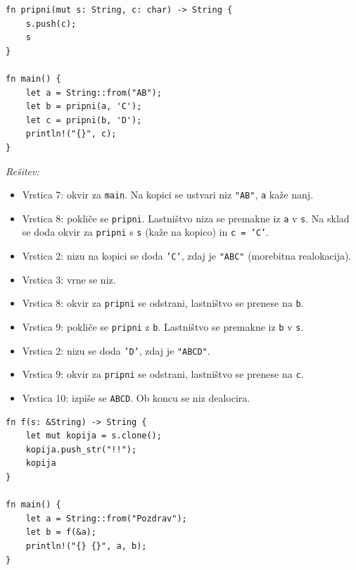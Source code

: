 \documentclass[arhiv]{../izpit}
\begin{document}
\podnaloga
\begin{verbatim}
fn pripni(mut s: String, c: char) -> String {
    s.push(c);
    s
}

fn main() {
    let a = String::from("AB");
    let b = pripni(a, 'C');
    let c = pripni(b, 'D');
    println!("{}", c);
}
\end{verbatim}

\noindent
\emph{Rešitev:}
\begin{itemize}
  \item Vrstica 7: okvir za \texttt{main}. Na kopici se ustvari niz \texttt{"AB"}, \texttt{a} kaže nanj.
  \item Vrstica 8: pokliče se \texttt{pripni}. Lastništvo niza se premakne iz \texttt{a} v \texttt{s}. Na sklad se doda okvir za \texttt{pripni} s \texttt{s} (kaže na kopico) in \texttt{c = 'C'}.
  \item Vrstica 2: nizu na kopici se doda \texttt{'C'}, zdaj je \texttt{"ABC"} (morebitna realokacija).
  \item Vrstica 3: vrne se niz.
  \item Vrstica 8: okvir za \texttt{pripni} se odstrani, lastništvo se prenese na \texttt{b}.
  \item Vrstica 9: pokliče se \texttt{pripni} z \texttt{b}. Lastništvo se premakne iz \texttt{b} v \texttt{s}.
  \item Vrstica 2: nizu se doda \texttt{'D'}, zdaj je \texttt{"ABCD"}.
  \item Vrstica 9: okvir za \texttt{pripni} se odstrani, lastništvo se prenese na \texttt{c}.
  \item Vrstica 10: izpiše se \texttt{ABCD}. Ob koncu se niz dealocira.
\end{itemize}

\podnaloga
\begin{verbatim}
fn f(s: &String) -> String {
    let mut kopija = s.clone();
    kopija.push_str("!!");
    kopija
}

fn main() {
    let a = String::from("Pozdrav");
    let b = f(&a);
    println!("{} {}", a, b);
}
\end{verbatim}
\end{document}

